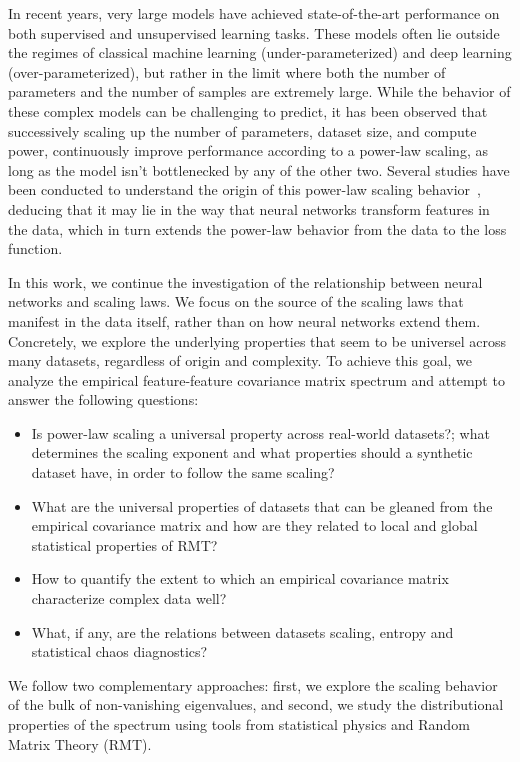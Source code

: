 \documentclass{article}
\begin{document}
In recent years, very large models have achieved state-of-the-art performance on both supervised and unsupervised learning tasks. 
These models often lie outside the regimes of classical machine learning (under-parameterized) and deep learning (over-parameterized), but rather in the limit  where both the number of parameters and the number of samples are extremely large.
While the behavior of these complex models can be challenging to predict, it has been observed that successively scaling up the number of parameters, dataset size, and compute power, continuously improve performance according to a power-law scaling, as long as the model isn’t bottlenecked by any of the other two.
Several studies have been conducted to understand the origin of this power-law scaling behavior~\cite{kaplan2020scaling, maloney2022solvable}, deducing that it may lie in the way that neural networks transform features in the data, which in turn extends the power-law behavior from the data to the loss function.

In this work, we continue the investigation of the relationship between neural networks and scaling laws. We focus on the source of the scaling laws that manifest in the data itself, rather than on how neural networks extend them.
Concretely, we explore the underlying properties that seem to be universel across many datasets, regardless of origin and complexity. To achieve this goal, we analyze the empirical feature-feature covariance matrix spectrum and attempt to answer the following questions:
\vspace{-.1cm}
\setlength{\leftmargini}{16pt}
\begin{itemize} \raggedright
    \item Is power-law scaling a universal property across real-world datasets?; 
    what determines the scaling exponent and
    what properties should a synthetic dataset have, in order to follow the same scaling? 
    \item 
    What are the universal properties of datasets that can be gleaned from the empirical covariance matrix and how are they related to local and global  statistical properties of RMT?
    \item 
    How to quantify the extent to which an empirical covariance matrix characterize complex data well?
    \item What, if any, are the relations between datasets scaling, entropy and statistical chaos diagnostics?
\end{itemize}

We follow two complementary approaches: first, we explore the scaling behavior of the bulk of non-vanishing eigenvalues, and second, we study the distributional properties of the spectrum using tools from statistical physics and Random Matrix Theory (RMT).
\end{document}
